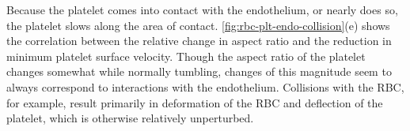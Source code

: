 Because the platelet comes into contact with the endothelium, or nearly does so, the platelet slows along the area
of contact. \cref{fig:rbc-plt-endo-collision}(e) shows the correlation between the relative change in aspect ratio
and the reduction in minimum platelet surface velocity. Though the aspect ratio of the platelet changes somewhat
while normally tumbling, changes of this magnitude seem to always correspond to interactions with the endothelium.
Collisions with the RBC, for example, result primarily in deformation of the RBC and deflection of the platelet,
which is otherwise relatively unperturbed.

